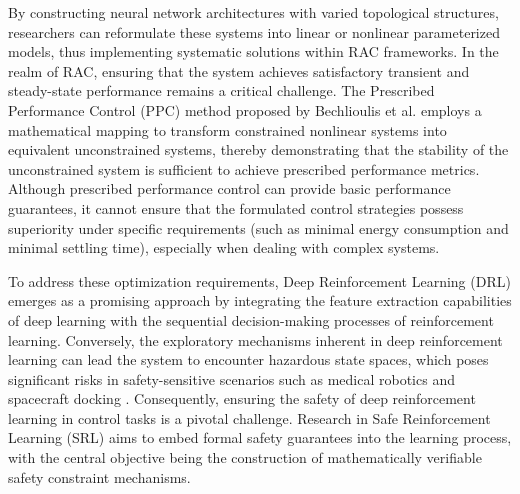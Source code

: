 \documentclass[preprint,12pt]{elsarticle}
\begin{document}
By constructing neural network architectures with varied topological structures, researchers can reformulate these systems into linear or nonlinear parameterized models, thus implementing systematic solutions within RAC frameworks. In the realm of RAC, ensuring that the system achieves satisfactory transient and steady-state performance remains a critical challenge. The Prescribed Performance Control (PPC) method proposed by Bechlioulis et al. \cite{4639441,5406132,BECHLIOULIS2009532} employs a mathematical mapping to transform constrained nonlinear systems into equivalent unconstrained systems, thereby demonstrating that the stability of the unconstrained system is sufficient to achieve prescribed performance metrics. Although prescribed performance control can provide basic performance guarantees, it cannot ensure that the formulated control strategies possess superiority under specific requirements (such as minimal energy consumption and minimal settling time), especially when dealing with complex systems.

To address these optimization requirements, Deep Reinforcement Learning (DRL) emerges as a promising approach by integrating the feature extraction capabilities of deep learning with the sequential decision-making processes of reinforcement learning. Conversely, the exploratory mechanisms inherent in deep reinforcement learning can lead the system to encounter hazardous state spaces, which poses significant risks in safety-sensitive scenarios such as medical robotics and spacecraft docking \cite{brunke2021safelearningroboticslearningbased}. Consequently, ensuring the safety of deep reinforcement learning in control tasks is a pivotal challenge. Research in Safe Reinforcement Learning (SRL) aims to embed formal safety guarantees into the learning process, with the central objective being the construction of mathematically verifiable safety constraint mechanisms\cite{LIU202313737}.
\end{document}
